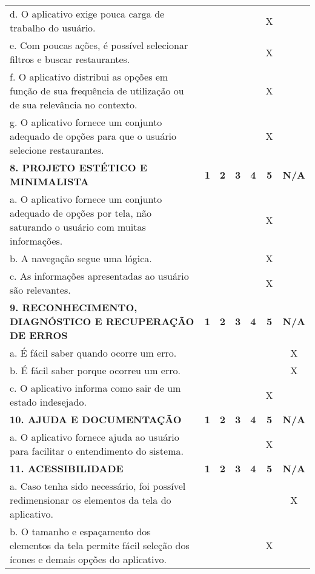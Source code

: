 \documentclass[portuguese,oneside]{tcc}
\begin{document}
\begin{center}
\begin{longtabu}{|L{25em}|c|c|c|c|c|c|}
			d. O aplicativo exige pouca carga de trabalho do usuário. & & & & & X & \\ 
			e. Com poucas ações, é possível selecionar filtros e buscar restaurantes. & & & & & X & \\ 
			f. O aplicativo distribui as opções em função de sua frequência de utilização ou de sua relevância no contexto.	& & & & & X & \\ 
			g. O aplicativo fornece um conjunto adequado de opções para que o usuário selecione restaurantes. & & & & & X & \\ 
			\textbf{8. PROJETO ESTÉTICO E MINIMALISTA} & \textbf{1} & \textbf{2} & \textbf{3} & \textbf{4} & \textbf{5} & \textbf{N/A} \\ 
			a. O aplicativo fornece um conjunto adequado de opções por tela, não saturando o usuário com muitas informações. & & & & & X & \\ 
			b. A navegação segue uma lógica. & & & & & X & \\ 
			c. As informações apresentadas ao usuário são relevantes. & & & & & X & \\ 
			\textbf{9. RECONHECIMENTO, DIAGNÓSTICO E RECUPERAÇÃO DE ERROS} & \textbf{1} & \textbf{2} & \textbf{3} & \textbf{4} & \textbf{5} & \textbf{N/A} \\ 
			a. É fácil saber quando ocorre um erro.	& & & & & & X \\ 
			b. É fácil saber porque ocorreu um erro. & & & & & & X \\ 
			c. O aplicativo informa como sair de um estado indesejado. & & & & & X & \\ 
			\textbf{10. AJUDA E DOCUMENTAÇÃO} & \textbf{1} & \textbf{2} & \textbf{3} & \textbf{4} & \textbf{5} & \textbf{N/A} \\ 
			a. O aplicativo fornece ajuda ao usuário para facilitar o entendimento do sistema. & & & & & X & \\ 
			\textbf{11. ACESSIBILIDADE} & \textbf{1} & \textbf{2} & \textbf{3} & \textbf{4} & \textbf{5} & \textbf{N/A} \\ 
			a. Caso tenha sido necessário, foi possível redimensionar os elementos da tela do aplicativo. & & & & & & X \\ 
			b. O tamanho e espaçamento dos elementos da tela permite fácil seleção dos ícones e demais opções do aplicativo. & & & & & X & \\ 

\end{longtabu}
\end{center}
\end{document}
